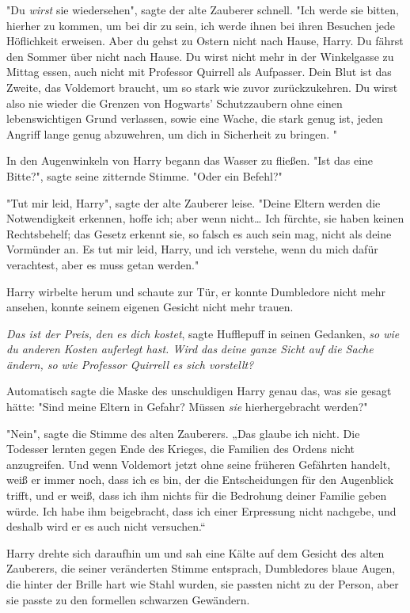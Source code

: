 {"Du \emph{wirst} sie wiedersehen", sagte der alte Zauberer schnell. "Ich werde sie bitten, hierher zu kommen, um bei dir zu sein, ich werde ihnen bei ihren Besuchen jede Höflichkeit erweisen. Aber du gehst zu Ostern nicht nach Hause, Harry. Du fährst den Sommer über nicht nach Hause. Du wirst nicht mehr in der Winkelgasse zu Mittag essen, auch nicht mit Professor Quirrell als Aufpasser. Dein Blut ist das Zweite, das Voldemort braucht, um so stark wie zuvor zurückzukehren. Du wirst also nie wieder die Grenzen von Hogwarts' Schutzzaubern ohne einen lebenswichtigen Grund verlassen, sowie eine Wache, die stark genug ist, jeden Angriff lange genug abzuwehren, um dich in Sicherheit zu bringen. "

In den Augenwinkeln von Harry begann das Wasser zu fließen. "Ist das eine Bitte?", sagte seine zitternde Stimme. "Oder ein Befehl?"

"Tut mir leid, Harry", sagte der alte Zauberer leise. "Deine Eltern werden die Notwendigkeit erkennen, hoffe ich; aber wenn nicht… Ich fürchte, sie haben keinen Rechtsbehelf; das Gesetz erkennt sie, so falsch es auch sein mag, nicht als deine Vormünder an. Es tut mir leid, Harry, und ich verstehe, wenn du mich dafür verachtest, aber es muss getan werden."

Harry wirbelte herum und schaute zur Tür, er konnte Dumbledore nicht mehr ansehen, konnte seinem eigenen Gesicht nicht mehr trauen.

\emph{Das ist der Preis,} \emph{den es dich kostet}, sagte Hufflepuff in seinen Gedanken, \emph{so wie} \emph{du anderen Kosten auferlegt hast. Wird das} \emph{deine} \emph{ganze Sicht auf die Sache ändern, so wie Professor Quirrell es sich vorstellt?}

Automatisch sagte die Maske des unschuldigen Harry genau das, was sie gesagt hätte: "Sind meine Eltern in Gefahr? Müssen \emph{sie} hierhergebracht werden?"

"Nein", sagte die Stimme des alten Zauberers. „Das glaube ich nicht. Die Todesser lernten gegen Ende des Krieges, die Familien des Ordens nicht anzugreifen. Und wenn Voldemort jetzt ohne seine früheren Gefährten handelt, weiß er immer noch, dass ich es bin, der die Entscheidungen für den Augenblick trifft, und er weiß, dass ich ihm nichts für die Bedrohung deiner Familie geben würde. Ich habe ihm beigebracht, dass ich einer Erpressung nicht nachgebe, und deshalb wird er es auch nicht versuchen.“

Harry drehte sich daraufhin um und sah eine Kälte auf dem Gesicht des alten Zauberers, die seiner veränderten Stimme entsprach, Dumbledores blaue Augen, die hinter der Brille hart wie Stahl wurden, sie passten nicht zu der Person, aber sie passte zu den formellen schwarzen Gewändern.

}

